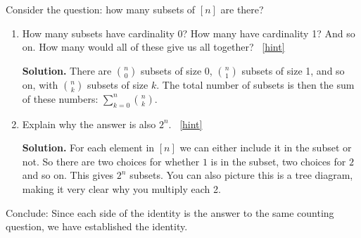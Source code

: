 \documentclass{book}
\begin{document}
\setcounter{project}{78}
\addtocounter{project}{-1}
\begin{activity}[]\label{activity-pascalrow-dc}
\hypertarget{p-616}{}%
Consider the question: how many subsets of \([n]\) are there?%
\begin{enumerate}[font=\bfseries,label=(\alph*),ref=\alph*]
\item\label{task-112} \hypertarget{p-617}{}%
How many subsets have cardinality 0?  How many have cardinality 1?  And so on.  How many would all of these give us all together?%
~\hfill{\tiny\hyperlink{a-78.a}{[hint]}\hypertarget{q-78.a}{}}\par\smallskip%
\noindent\textbf{Solution.}\hypertarget{solution-60}{}\quad%
\hypertarget{p-619}{}%
There are \(\binom{n}{0}\) subsets of size 0, \(\binom{n}{1}\) subsets of size 1, and so on, with \(\binom{n}{k}\) subsets of size \(k\).  The total number of subsets is then the sum of these numbers: \(\sum_{k=0}^n \binom{n}{k}\).%
\item\label{task-113} \hypertarget{p-620}{}%
Explain why the answer is also \(2^n\).%
~\hfill{\tiny\hyperlink{a-78.b}{[hint]}\hypertarget{q-78.b}{}}\par\smallskip%
\noindent\textbf{Solution.}\hypertarget{solution-61}{}\quad%
\hypertarget{p-622}{}%
For each element in \([n]\) we can either include it in the subset or not.  So there are two choices for whether \(1\) is in the subset, two choices for \(2\) and so on.  This gives \(2^n\) subsets.  You can also picture this is a tree diagram, making it very clear why you multiply each 2.%
\end{enumerate}
\bigbreak
\hypertarget{p-623}{}%
Conclude: Since each side of the identity is the answer to the same counting question, we have established the identity.%
\end{activity}
\end{document}
